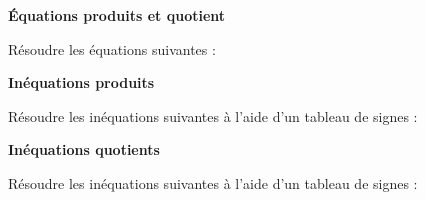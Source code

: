 \documentclass[12pt]{exam}
\begin{document}
\begin{questions}
\vspace{0.5cm}

\question \textbf{Équations produits et quotient}

Résoudre les équations suivantes :

\vspace{0.5cm}

\question \textbf{Inéquations produits}

Résoudre les inéquations suivantes à l’aide d’un tableau de signes :

\vspace{0.5cm}

\question \textbf{Inéquations quotients}

Résoudre les inéquations suivantes à l’aide d’un tableau de signes :

\vspace{0.5cm}


\end{questions}
\end{document}
